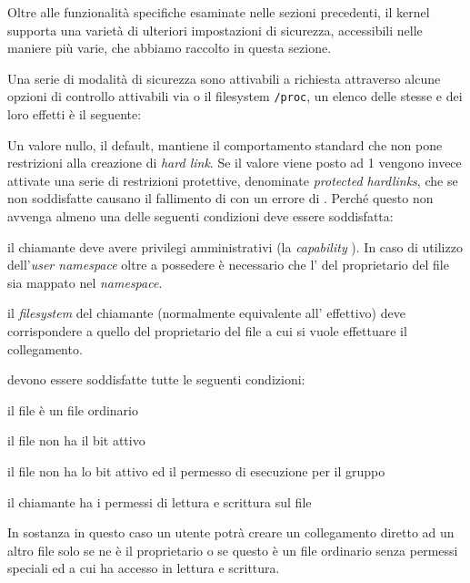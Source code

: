 Oltre alle funzionalità specifiche esaminate nelle sezioni precedenti, il
kernel supporta una varietà di ulteriori impostazioni di sicurezza,
accessibili nelle maniere più varie, che abbiamo raccolto in questa sezione.

Una serie di modalità di sicurezza sono attivabili a richiesta attraverso
alcune opzioni di controllo attivabili via  o il filesystem
\texttt{/proc}, un elenco delle stesse e dei loro effetti è il seguente:

\begin{basedescript}{\desclabelwidth{1cm}\desclabelstyle{\nextlinelabel}}
\item[\sysctlrelfiled{fs}{protected\_hardlinks}] Un valore nullo, il default,
  mantiene il comportamento standard che non pone restrizioni alla creazione
  di \textit{hard link}. Se il valore viene posto ad 1 vengono invece attivate
  una serie di restrizioni protettive, denominate
   \textit{protected hardlinks}, che se non
  soddisfatte causano il fallimento di  con un errore di
  . Perché questo non avvenga almeno una delle seguenti
  condizioni deve essere soddisfatta:
  \begin{itemize*}
  \item il chiamante deve avere privilegi amministrativi (la
    \textit{capability} ). In caso di utilizzo
    dell'\textit{user namespace} oltre a possedere  è
    necessario che l' del proprietario del file sia mappato nel
    \textit{namespace}.
  \item il \textit{filesystem}  del chiamante (normalmente
    equivalente all' effettivo) deve corrispondere a quello del
    proprietario del file a cui si vuole effettuare il collegamento.
  \item devono essere soddisfatte tutte le seguenti condizioni:
    \begin{itemize*}
    \item il file è un file ordinario
    \item il file non ha il  bit attivo
    \item il file non ha lo  bit attivo ed il permesso di esecuzione
      per il gruppo
    \item il chiamante ha i permessi di lettura e scrittura sul file
    \end{itemize*}
  \end{itemize*}

  In sostanza in questo caso un utente potrà creare un collegamento diretto ad
  un altro file solo se ne è il proprietario o se questo è un file ordinario
  senza permessi speciali ed a cui ha accesso in lettura e scrittura.


\end{basedescript}
